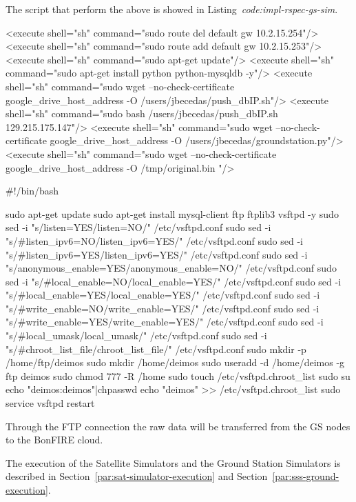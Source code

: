 The script that perform the above is showed in Listing~\emph{code:impl-rspec-gs-sim}.

\begin{listing}[
  float=h!,
  caption  = {RSPEC specification for \emph{Ground Stations Simulators}},
  label    = code:impl-rspec-gs-sim,
  style=customc]

<execute shell="sh" command="sudo route del default gw 10.2.15.254"/> <execute shell="sh" command="sudo route add default gw 10.2.15.253"/>
<execute shell="sh" command="sudo apt-get update"/>  <execute shell="sh" command="sudo apt-get install python python-mysqldb -y"/>
<execute shell="sh" command="sudo wget --no-check-certificate google_drive_host_address -O /users/jbecedas/push_dbIP.sh"/> <execute shell="sh" command="sudo bash /users/jbecedas/push_dbIP.sh 129.215.175.147"/>
<execute shell="sh" command="sudo wget --no-check-certificate google_drive_host_address
-O /users/jbecedas/groundstation.py"/>
<execute shell="sh" command="sudo wget --no-check-certificate google_drive_host_address -O
/tmp/original.bin "/> 
\end{listing}

\begin{listing}[
  float=h!,
  caption  = {FTP server installation},
  label    = code:impl-ftp-installation,
  style=customc]

#!/bin/bash

sudo apt-get update
sudo apt-get install mysql-client ftp ftplib3 vsftpd -y
sudo sed -i "s/listen=YES/listen=NO/" /etc/vsftpd.conf
sudo sed -i "s/#listen_ipv6=NO/listen_ipv6=YES/" /etc/vsftpd.conf
sudo sed -i "s/#listen_ipv6=YES/listen_ipv6=YES/" /etc/vsftpd.conf
sudo sed -i "s/anonymous_enable=YES/anonymous_enable=NO/" /etc/vsftpd.conf
sudo sed -i "s/#local_enable=NO/local_enable=YES/" /etc/vsftpd.conf
sudo sed -i "s/#local_enable=YES/local_enable=YES/" /etc/vsftpd.conf
sudo sed -i "s/#write_enable=NO/write_enable=YES/" /etc/vsftpd.conf
sudo sed -i "s/#write_enable=YES/write_enable=YES/" /etc/vsftpd.conf
sudo sed -i "s/#local_umask/local_umask/" /etc/vsftpd.conf
sudo sed -i "s/#chroot_list_file/chroot_list_file/" /etc/vsftpd.conf
sudo mkdir -p /home/ftp/deimos
sudo mkdir /home/deimos
sudo useradd -d /home/deimos -g ftp  deimos
sudo chmod 777 -R /home
sudo touch /etc/vsftpd.chroot_list
sudo su
echo "deimos:deimos"|chpasswd
echo "deimos" >> /etc/vsftpd.chroot_list
sudo service vsftpd restart
\end{listing}

Through the FTP connection the raw data will be transferred from the GS nodes to the BonFIRE cloud. 

The execution of the Satellite Simulators and the Ground Station Simulators is described
in Section~\ref{par:sat-simulator-execution} and Section~\ref{par:sss-ground-execution}. 

